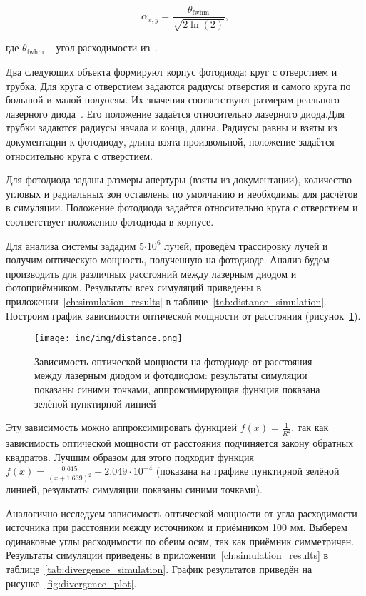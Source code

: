 \begin{equation*}
    \alpha_{x, y}=\frac{\theta_{\mathrm{fwhm}}}{\sqrt{2 \ln (2)}},
\end{equation*}

где $\theta_{\mathrm{fwhm}}$ \--- угол расходимости из~\cite{LDThorlabs}.

Два следующих объекта формируют корпус фотодиода: круг с отверстием и трубка. Для круга с отверстием задаются радиусы отверстия и самого круга по большой и малой полуосям. Их значения соответствуют размерам реального лазерного диода~\cite{PDThorlabs}. Его положение задаётся относительно лазерного диода.Для трубки задаются радиусы начала и конца, длина. Радиусы равны и взяты из документации к фотодиоду, длина взята произвольной, положение задаётся относительно круга с отверстием.

Для фотодиода заданы размеры апертуры (взяты из документации), количество угловых и радиальных зон оставлены по умолчанию и необходимы для расчётов в симуляции. Положение фотодиода задаётся относительно круга с отверстием и соответствует положению фотодиода в корпусе.

Для анализа системы зададим 5$\cdot \text{10}^6$ лучей, проведём трассировку лучей и получим оптическую мощность, полученную на фотодиоде. Анализ будем производить для различных расстояний между лазерным диодом и фотоприёмником. Результаты всех симуляций приведены в приложении~\ref{ch:simulation_results} в таблице~\ref{tab:distance_simulation}. Построим график зависимости оптической мощности от расстояния (рисунок~\ref{fig:distance_plot}).

\begin{figure}[h]
    \centering
    \texttt{[image: inc/img/distance.png]}
    \caption{Зависимость оптической мощности на фотодиоде от расстояния между лазерным диодом и фотодиодом: результаты симуляции показаны синими точками, аппроксимирующая функция показана зелёной пунктирной линией}
    \label{fig:distance_plot}
\end{figure}

Эту зависимость можно аппроксимировать функцией $f(x) = \frac{1}{R^2}$, так как зависимость оптической мощности от расстояния подчиняется закону обратных квадратов. Лучшим образом для этого подходит функция $f(x) = \frac{0.615}{(x+1.639)^2} - 2.049\cdot10^{-4}$ (показана на графике пунктирной зелёной линией, результаты симуляции показаны синими точками).

Аналогично исследуем зависимость оптической мощности от угла расходимости источника при расстоянии между источником и приёмником 100 мм. Выберем одинаковые углы расходимости по обеим осям, так как приёмник симметричен. Результаты симуляции приведены в приложении~\ref{ch:simulation_results} в таблице~\ref{tab:divergence_simulation}. График результатов приведён на рисунке~\ref{fig:divergence_plot}.

